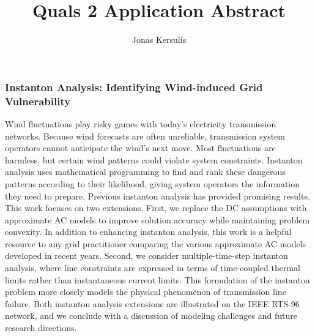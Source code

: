 \documentclass[10pt,letterpaper]{article}
\author{Jonas Kersulis}
\title{Quals 2 Application Abstract}
\begin{document}
\maketitle
\subsubsection*{Instanton Analysis: Identifying Wind-induced Grid Vulnerability}

Wind fluctuations play risky games with today's electricity transmission networks. Because wind forecasts are often unreliable, transmission system operators cannot anticipate the wind's next move. Most fluctuations are harmless, but certain wind patterns could violate system constraints. Instanton analysis uses mathematical programming to find and rank these dangerous patterns according to their likelihood, giving system operators the information they need to prepare. Previous instanton analysis has provided promising results. This work focuses on two extensions. First, we replace the DC assumptions with approximate AC models to improve solution accuracy while maintaining problem convexity. In addition to enhancing instanton analysis, this work is a helpful resource to any grid practitioner comparing the various approximate AC models developed in recent years. Second, we consider multiple-time-step instanton analysis, where line constraints are expressed in terms of time-coupled thermal limits rather than instantaneous current limits. This formulation of the instanton problem more closely models the physical phenomenon of transmission line failure. Both instanton analysis extensions are illustrated on the IEEE RTS-96 network, and we conclude with a discussion of modeling challenges and future research directions.
\end{document}
